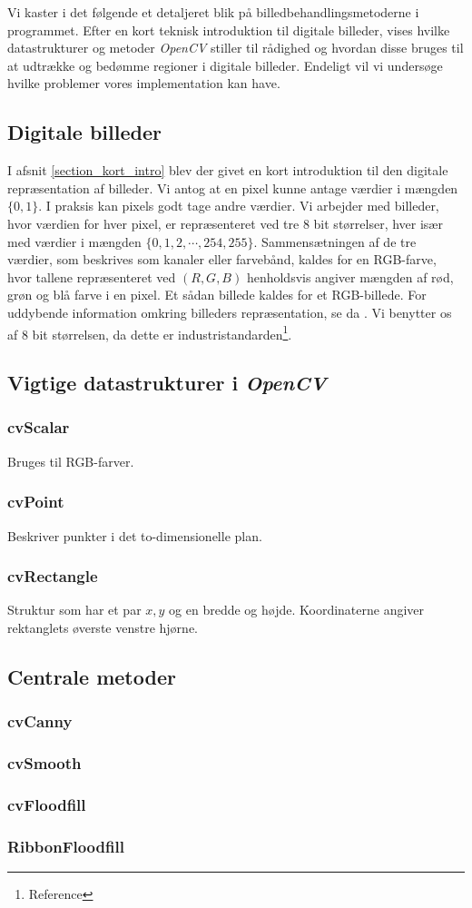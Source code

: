 {
{\sffamily Vi kaster i det følgende et detaljeret blik på
billedbehandlingsmetoderne i programmet. Efter en kort teknisk
introduktion til digitale billeder, vises hvilke datastrukturer og
metoder \emph{OpenCV} stiller til rådighed og hvordan disse bruges til
at udtrække og bedømme regioner i digitale billeder. Endeligt vil vi
undersøge hvilke problemer vores implementation kan have.
}

\subsection{Digitale billeder}
I afsnit \ref{section_kort_intro} blev der givet en kort introduktion
til den digitale repræsentation af billeder. Vi antog at en pixel kunne
antage værdier i mængden $\{0, 1\}$. I praksis kan pixels godt tage
andre værdier. Vi arbejder med billeder, hvor værdien for hver pixel, er
repræsenteret ved tre 8 bit størrelser, hver især med værdier i mængden
$\{0, 1, 2, \cdots, 254, 255\}$. Sammensætningen af de tre værdier, som
beskrives som kanaler eller farvebånd, kaldes for en RGB-farve, hvor
tallene repræsenteret ved $(R,G,B)$ henholdsvis angiver mængden af rød,
grøn og blå farve i en pixel. Et sådan billede kaldes for et
RGB-billede. For uddybende information omkring billeders repræsentation,
se da \cite{SIOlsen}. Vi benytter os af 8 bit størrelsen, da dette er
industristandarden\footnote{Reference}.

\subsection{Vigtige datastrukturer i \emph{OpenCV}}
\subsubsection{cvScalar}
Bruges til RGB-farver.

\subsubsection{cvPoint}
Beskriver punkter i det to-dimensionelle plan.

\subsubsection{cvRectangle}
Struktur som har et par $x,y$ og en bredde og højde. Koordinaterne
angiver rektanglets øverste venstre hjørne.

\subsection{Centrale metoder}
\subsubsection{cvCanny}
\subsubsection{cvSmooth}
\subsubsection{cvFloodfill}
\subsubsection{RibbonFloodfill}

}

